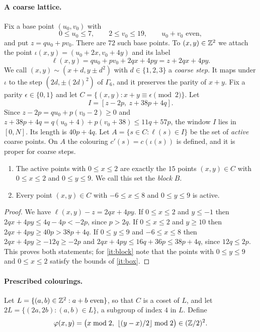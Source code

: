 \documentclass[11pt,colorlinks]{charlie}
\begin{document}
\paragraph{A coarse lattice.}
Fix a base point $(u_0,v_0)$ with
\begin{equation}\label{eq:base}
0\le u_0\le7,\qquad 2\le v_0\le19,\qquad u_0+v_0\text{ even},
\end{equation}
and put $z=qu_0+pv_0$. There are $72$ such base points. To $(x,y)\in\mathbb{Z}^2$ we attach the point $\iota(x,y)=(u_0+2x,v_0+4y)$ and its label
\[
\ell(x,y)=qu_0+pv_0+2qx+4py=z+2qx+4py .
\]
We call $(x,y)\sim(x+d,y\pm d^2)$ with $d\in\{1,2,3\}$ a \emph{coarse step}. It maps under $\iota$ to the step $(2d,\pm(2d)^2)$ of $\Gamma_6$, and it preserves the parity of $x+y$. Fix a parity $\epsilon\in\{0,1\}$ and let $C=\{(x,y):x+y\equiv\epsilon\pmod2\}$. Let
\[
I=[z-2p,\ z+38p+4q].
\]
Since $z-2p=qu_0+p(v_0-2)\ge0$ and $z+38p+4q=q(u_0+4)+p(v_0+38)\le11q+57p$, the window $I$ lies in $[0,N]$. Its length is $40p+4q$. Let $A=\{s\in C:\ell(s)\in I\}$ be the set of \emph{active} coarse points. On $A$ the colouring $c'(s)=c(\iota(s))$ is defined, and it is proper for coarse steps.

\begin{lemma}\label{lem:active}
\begin{enumerate}
\item\label{it:block} The active points with $0\le x\le2$ are exactly the $15$ points $(x,y)\in C$ with $0\le x\le2$ and $0\le y\le9$. We call this set the \emph{block} $B$.
\item\label{it:box} Every point $(x,y)\in C$ with $-6\le x\le8$ and $0\le y\le9$ is active.
\end{enumerate}
\end{lemma}

\begin{proof}
We have $\ell(x,y)-z=2qx+4py$. If $0\le x\le2$ and $y\le-1$ then $2qx+4py\le4q-4p<-2p$, since $p>2q$. If $0\le x\le2$ and $y\ge10$ then $2qx+4py\ge40p>38p+4q$. If $0\le y\le9$ and $-6\le x\le8$ then $2qx+4py\ge-12q\ge-2p$ and $2qx+4py\le16q+36p\le38p+4q$, since $12q\le2p$. This proves both statements; for \ref{it:block} note that the points with $0\le y\le9$ and $0\le x\le2$ satisfy the bounds of \ref{it:box}.
\end{proof}

\paragraph{Prescribed colourings.}
Let $L=\{(a,b)\in\mathbb{Z}^2:a+b\text{ even}\}$, so that $C$ is a coset of $L$, and let $2L=\{(2a,2b):(a,b)\in L\}$, a subgroup of index $4$ in $L$. Define
\[
\varphi(x,y)=\bigl(x\bmod2,\ \lfloor(y-x)/2\rfloor\bmod2\bigr)\in(\Z/2)^2 .
\]
\end{document}
